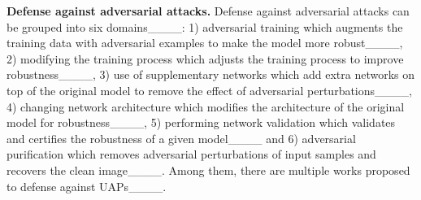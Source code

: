 \textbf{Defense against adversarial attacks.} 
Defense against adversarial attacks can be grouped into six domains____: 1) adversarial training which augments the training data with adversarial examples to make the model more robust____, 2) modifying the training process which adjusts the training process to improve robustness____, 3) use of supplementary networks which add extra networks on top of the original model to remove the effect of adversarial perturbations____, 4) changing network architecture which modifies the architecture of the original model for robustness____, 5) performing network validation which validates and certifies the robustness of a given model____ and 6) adversarial purification which removes adversarial perturbations of input samples and recovers the clean image____. Among them, there are multiple works proposed to defense against UAPs____.
